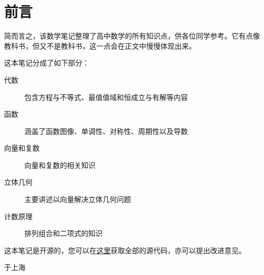 \section*{前言}
简而言之，该数学笔记整理了高中数学的所有知识点，供各位同学参考。它有点像教科书，但又不是教科书，这一点会在正文中慢慢体现出来。

这本笔记分成了如下部分：

\begin{description}
	\item[代数] 包含方程与不等式、最值值域和恒成立与有解等内容
	\item[函数] 涵盖了函数图像、单调性、对称性、周期性以及导数
	\item[向量和复数] 向量和复数的相关知识
	\item[立体几何] 主要讲述以向量解决立体几何问题
	\item[计数原理] 排列组合和二项式的知识
\end{description}

这本笔记是开源的，您可以在\href{https://github.com/jason-bowen-zheng/math-notes}{这里}获取全部的源代码，亦可以提出改进意见。
\hypersetup{hidelinks}

\begin{flushright}
	\date{2022年11月}于上海
\end{flushright}
